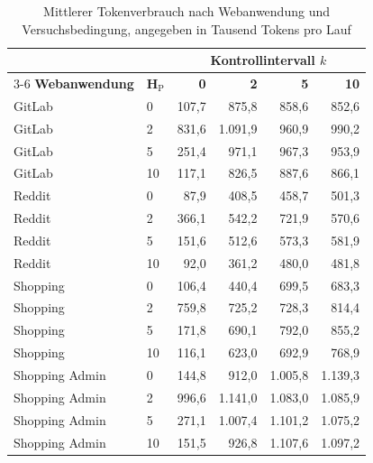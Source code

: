 \begin{table}[htbp]
    \centering
    \footnotesize
    \renewcommand{\arraystretch}{1.12}
    \begin{tabular}{llrrrr}
        \toprule
        & &
        \multicolumn{4}{c}{\textbf{Kontrollintervall \(k\)}} \\
        \cmidrule(lr){3-6}
        \textbf{Webanwendung} &
        \(\boldsymbol{H_{\mathrm{P}}}\) &
        \textbf{0} &
        \textbf{2} &
        \textbf{5} &
        \textbf{10} \\
        \midrule
        GitLab & 0  & 107,7 & 875,8  & 858,6  & 852,6 \\
        GitLab & 2  & 831,6 & 1.091,9 & 960,9  & 990,2 \\
        GitLab & 5  & 251,4 & 971,1  & 967,3  & 953,9 \\
        GitLab & 10 & 117,1 & 826,5  & 887,6  & 866,1 \\
        \addlinespace

        Reddit & 0  & 87,9  & 408,5 & 458,7 & 501,3 \\
        Reddit & 2  & 366,1 & 542,2 & 721,9 & 570,6 \\
        Reddit & 5  & 151,6 & 512,6 & 573,3 & 581,9 \\
        Reddit & 10 & 92,0  & 361,2 & 480,0 & 481,8 \\
        \addlinespace

        Shopping & 0  & 106,4 & 440,4 & 699,5 & 683,3 \\
        Shopping & 2  & 759,8 & 725,2 & 728,3 & 814,4 \\
        Shopping & 5  & 171,8 & 690,1 & 792,0 & 855,2 \\
        Shopping & 10 & 116,1 & 623,0 & 692,9 & 768,9 \\
        \addlinespace

        Shopping Admin & 0  & 144,8 & 912,0   & 1.005,8 & 1.139,3 \\
        Shopping Admin & 2  & 996,6 & 1.141,0 & 1.083,0 & 1.085,9 \\
        Shopping Admin & 5  & 271,1 & 1.007,4 & 1.101,2 & 1.075,2 \\
        Shopping Admin & 10 & 151,5 & 926,8   & 1.107,6 & 1.097,2 \\
        \bottomrule
    \end{tabular}
    \caption{Mittlerer Tokenverbrauch nach Webanwendung und
    Versuchsbedingung, angegeben in Tausend Tokens pro Lauf}
    \label{tab:site-tokenverbrauch-hk}
\end{table}
